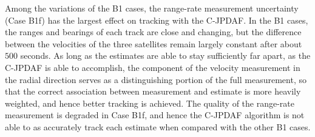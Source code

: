 \documentclass[letterpaper, paper,10pt]{AAS}		%
\begin{document}
Among the variations of the B1 cases, the range-rate measurement uncertainty (Case B1f) has the largest effect on tracking with the C-JPDAF.
In the B1 cases, the ranges and bearings of each track are close and changing, but the difference between the velocities of the three satellites remain largely constant after about $500$ seconds.
As long as the estimates are able to stay sufficiently far apart, as the C-JPDAF is able to accomplish, the component of the velocity measurement in the radial direction serves as a distinguishing portion of the full measurement, so that the correct association between measurement and estimate is more heavily weighted, and hence better tracking is achieved.
The quality of the range-rate measurement is degraded in Case B1f, and hence the C-JPDAF algorithm is not able to as accurately track each estimate when compared with the other B1 cases.
\end{document}

